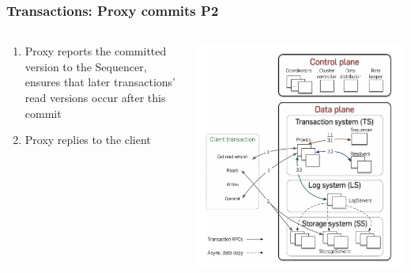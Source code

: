 \begin{frame}
    \frametitle{Transactions: Proxy commits P2}
    \begin{columns}
        \begin{column}{0.5\textwidth}
            \begin{enumerate}
    \item Proxy reports the committed version to the Sequencer, ensures that later transactions' read versions occur after this commit
    \item Proxy replies to the client
            \end{enumerate}
        \end{column}
        \begin{column}{0.5\textwidth}
            \centering
            \includegraphics[width=\textwidth]{img/2-Architecture/Architecture and transaction processing.png}
        \end{column}
    \end{columns}
\end{frame}





